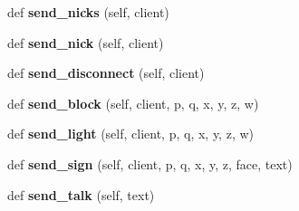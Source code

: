 \begin{DoxyCompactItemize}
\item 
\mbox{\label{classserver_1_1Model_ab39036fff36add7d7dced2892d4f7749}} 
def {\bfseries send\+\_\+nicks} (self, client)
\item 
\mbox{\label{classserver_1_1Model_a9acbf2a15a0a96e0232b9ac22173496d}} 
def {\bfseries send\+\_\+nick} (self, client)
\item 
\mbox{\label{classserver_1_1Model_a1fb58f37e3b98007a6e220a18d0abb4d}} 
def {\bfseries send\+\_\+disconnect} (self, client)
\item 
\mbox{\label{classserver_1_1Model_a24dcce0e4633051852b7bff4901ef13d}} 
def {\bfseries send\+\_\+block} (self, client, p, q, x, y, z, w)
\item 
\mbox{\label{classserver_1_1Model_a06aaa76ac9e9f36bbc9fd35d131b150d}} 
def {\bfseries send\+\_\+light} (self, client, p, q, x, y, z, w)
\item 
\mbox{\label{classserver_1_1Model_ad9bb38de307f92f2e34059e8c21217b8}} 
def {\bfseries send\+\_\+sign} (self, client, p, q, x, y, z, face, text)
\item 
\mbox{\label{classserver_1_1Model_ac72b296e1388a69afa59ccb6a1412770}} 
def {\bfseries send\+\_\+talk} (self, text)
\end{DoxyCompactItemize}
